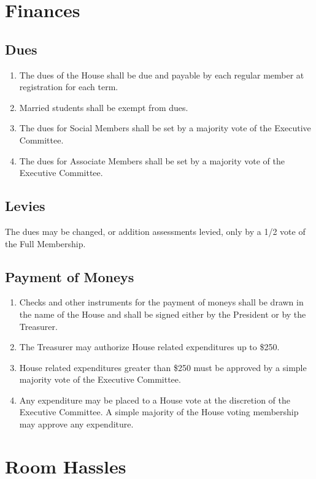 \documentclass[10pt]{article} %
\begin{document}
\section{Finances}
\subsection{Dues}
\begin{enumerate}
\item The dues of the House shall be due and payable by each regular member at registration for each term. 
\item Married students shall be exempt from dues.
\item The dues for Social Members shall be set by a majority vote of the Executive Committee.
\item The dues for Associate Members shall be set by a majority vote of the Executive Committee.
\end{enumerate}
\subsection{Levies}
The dues may be changed, or addition assessments levied, only by a 1/2 vote of the Full Membership.
\subsection{Payment of Moneys}
\begin{enumerate}
\item Checks and other instruments for the payment of moneys shall be drawn in the name of the House and shall be signed either by the President or by the Treasurer.
\item The Treasurer may authorize House related expenditures up to \$250.
\item House related expenditures greater than \$250 must be approved by a simple majority vote of the Executive Committee.
\item Any expenditure may be placed to a House vote at the discretion of the Executive Committee. A simple majority of the House voting membership may approve any expenditure.
\end{enumerate}
\section{Room Hassles}
\end{document}
